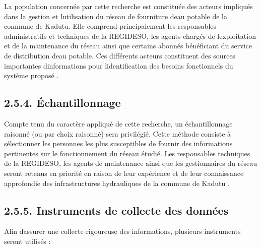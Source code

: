 \documentclass[12pt,a4paper,oneside]{report}
\begin{document}
La population concernée par cette recherche est constituée des acteurs
impliqués dans la gestion et l\textquotesingle utilisation du réseau de
fourniture d\textquotesingle eau potable de la commune de Kadutu. Elle
comprend principalement les responsables administratifs et techniques de
la REGIDESO, les agents chargés de l\textquotesingle exploitation et de
la maintenance du réseau ainsi que certains abonnés bénéficiant du
service de distribution d\textquotesingle eau potable. Ces différents
acteurs constituent des sources importantes
d\textquotesingle informations pour l\textquotesingle identification des
besoins fonctionnels du système proposé \cite{ref112}.

\subsection{\texorpdfstring{\textbf{2.5.4.
Échantillonnage}}{2.5.4. Échantillonnage}}\label{uxe9chantillonnage}

Compte tenu du caractère appliqué de cette recherche, un échantillonnage
raisonné (ou par choix raisonné) sera privilégié. Cette méthode consiste
à sélectionner les personnes les plus susceptibles de fournir des
informations pertinentes sur le fonctionnement du réseau étudié. Les
responsables techniques de la REGIDESO, les agents de maintenance ainsi
que les gestionnaires du réseau seront retenus en priorité en raison de
leur expérience et de leur connaissance approfondie des infrastructures
hydrauliques de la commune de Kadutu \cite{ref113}.

\subsection{\texorpdfstring{\textbf{2.5.5. Instruments de collecte des
données}}{2.5.5. Instruments de collecte des données}}\label{instruments-de-collecte-des-donnuxe9es}

Afin d\textquotesingle assurer une collecte rigoureuse des informations,
plusieurs instruments seront utilisés :
\end{document}
